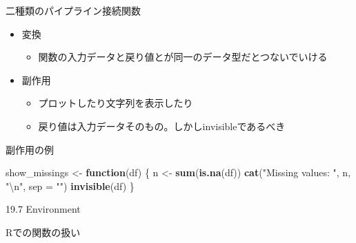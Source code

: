 \documentclass[ignorenonframetext,]{beamer}
\newenvironment{Shaded}{\begin{snugshade}}{\end{snugshade}}
\newcommand{\KeywordTok}[1]{\textcolor[rgb]{0.13,0.29,0.53}{\textbf{#1}}}
\newcommand{\DataTypeTok}[1]{\textcolor[rgb]{0.13,0.29,0.53}{#1}}
\newcommand{\CharTok}[1]{\textcolor[rgb]{0.31,0.60,0.02}{#1}}
\newcommand{\StringTok}[1]{\textcolor[rgb]{0.31,0.60,0.02}{#1}}
\newcommand{\ControlFlowTok}[1]{\textcolor[rgb]{0.13,0.29,0.53}{\textbf{#1}}}
\newcommand{\NormalTok}[1]{#1}
\providecommand{\tightlist}{%
  \setlength{\itemsep}{0pt}\setlength{\parskip}{0pt}}
\begin{document}
\begin{frame}[fragile]{二種類のパイプライン接続関数}

\begin{itemize}
\tightlist
\item
  変換

  \begin{itemize}
  \tightlist
  \item
    関数の入力データと戻り値とが同一のデータ型だとつないでいける
  \end{itemize}
\item
  副作用

  \begin{itemize}
  \tightlist
  \item
    プロットしたり文字列を表示したり
  \item
    戻り値は入力データそのもの。しかしinvisibleであるべき
  \end{itemize}
\end{itemize}

\begin{block}{副作用の例}

\begin{Shaded}
\begin{Highlighting}[]
\NormalTok{show_missings <-}\StringTok{ }\ControlFlowTok{function}\NormalTok{(df) \{}
\NormalTok{  n <-}\StringTok{ }\KeywordTok{sum}\NormalTok{(}\KeywordTok{is.na}\NormalTok{(df))}
  \KeywordTok{cat}\NormalTok{(}\StringTok{"Missing values: "}\NormalTok{, n, }\StringTok{"}\CharTok{\textbackslash{}n}\StringTok{"}\NormalTok{, }\DataTypeTok{sep =} \StringTok{""}\NormalTok{) }
  \KeywordTok{invisible}\NormalTok{(df)}
\NormalTok{\}}
\end{Highlighting}
\end{Shaded}

\end{block}

\end{frame}

\begin{frame}{19.7 Environment}

Rでの関数の扱い

\end{frame}
\end{document}
